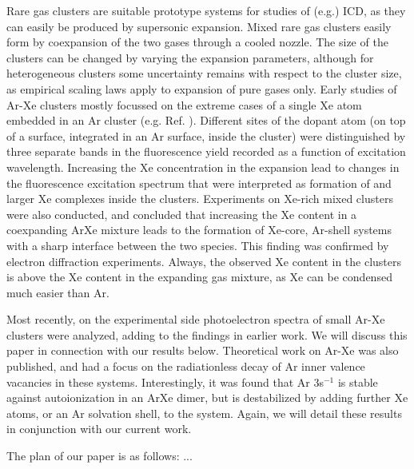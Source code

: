 Rare gas clusters are suitable prototype systems for studies of (e.g.) ICD, as they can easily be produced by supersonic expansion. Mixed rare gas clusters easily form by coexpansion of the two gases through a cooled nozzle. The size of the clusters can be changed by varying the expansion parameters, although for heterogeneous clusters some uncertainty remains with respect to the cluster size, as empirical scaling laws \cite{hagena1981} apply to expansion of pure gases only. Early studies of Ar-Xe clusters mostly focussed on the extreme cases of a single Xe atom embedded in an Ar cluster (e.g. Ref. ). Different sites of the dopant atom (on top of a surface, integrated in an Ar surface, inside the cluster) were distinguished by three separate bands in the fluorescence yield recorded as a function of excitation wavelength.\cite{lengenprl} Increasing the Xe concentration in the expansion lead to changes in the fluorescence excitation spectrum that were interpreted as formation of  and larger Xe complexes inside the clusters.\cite{lengen} Experiments on Xe-rich mixed clusters were also conducted, and concluded that increasing the Xe content in a coexpanding ArXe mixture leads to the formation of Xe-core, Ar-shell systems with a sharp interface between the two species.\cite{tchaplyguine,hoener} This finding was confirmed by electron diffraction experiments.\cite{Danylchenko} Always, the observed Xe content in the clusters is above the Xe content in the expanding gas mixture, as Xe can be condensed much easier than Ar.

Most recently, on the experimental side photoelectron spectra of small Ar-Xe clusters were analyzed, adding to the findings in earlier work.\cite{Lindblad} We will discuss this paper in connection with our results below. Theoretical work on Ar-Xe was also published, and had a focus on the radiationless decay of Ar inner valence vacancies in these systems.\cite{fasshauer,fasshauer_b} Interestingly, it was found that Ar 3s$^{-1}$ is stable against autoionization in an ArXe dimer, but is destabilized by adding further Xe atoms, or an Ar solvation shell, to the system. Again, we will detail these results in conjunction with our current work.

The plan of our paper is as follows: ...



